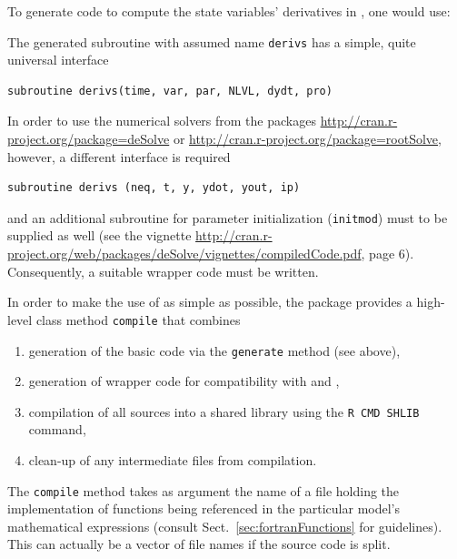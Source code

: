 \documentclass[onecolumn]{article}
\begin{document}
To generate code to compute the state variables' derivatives in , one would use:

\begin{Schunk}
\end{Schunk}

The generated  subroutine with assumed name \verb|derivs| has a simple, quite universal interface

\begin{verbatim}
subroutine derivs(time, var, par, NLVL, dydt, pro)
\end{verbatim}

In order to use the numerical solvers from the packages \url{http://cran.r-project.org/package=deSolve} or \url{http://cran.r-project.org/package=rootSolve}, however, a different interface is required

\begin{verbatim}
subroutine derivs (neq, t, y, ydot, yout, ip)
\end{verbatim}

and an additional subroutine for parameter initialization (\verb|initmod|) must to be supplied as well (see the  vignette \url{http://cran.r-project.org/web/packages/deSolve/vignettes/compiledCode.pdf}, page 6). Consequently, a suitable wrapper code must be written.

In order to make the use of  as simple as possible, the  package provides a high-level class method \verb|compile| that combines

\begin{enumerate}
\item generation of the basic  code via the \verb|generate| method (see above),
\item generation of wrapper code for compatibility with  and ,
\item compilation of all  sources into a shared library using the \verb|R CMD SHLIB| command,
\item clean-up of any intermediate files from compilation.
\end{enumerate}

The \verb|compile| method takes as argument the name of a file holding the  implementation of functions being referenced in the particular model's mathematical expressions (consult Sect.~\ref{sec:fortranFunctions} for guidelines). This can actually be a vector of file names if the source code is split.
\end{document}
